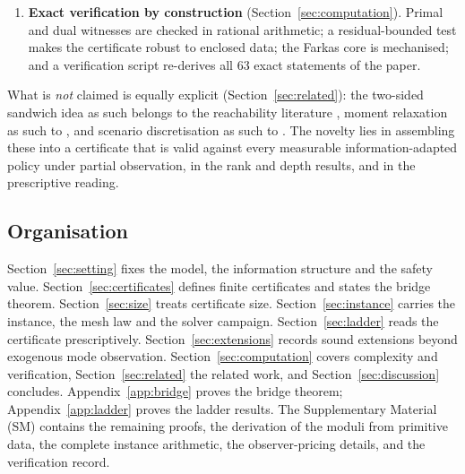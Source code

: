 \begin{enumerate}[leftmargin=1.6em,itemsep=2pt]
\item \textbf{Exact verification by construction} (Section~\ref{sec:computation}). Primal and dual witnesses are checked in rational arithmetic; a residual-bounded test makes the certificate robust to enclosed data; the Farkas core is mechanised; and a verification script re-derives all 63 exact statements of the paper.
\end{enumerate}

What is \emph{not} claimed is equally explicit (Section~\ref{sec:related}): the two-sided sandwich idea as such belongs to the reachability literature \cite{Maidens2013}, moment relaxation as such to \cite{Lasserre2001,Parrilo2003,Lasserre2008}, and scenario discretisation as such to \cite{CalafioreCampi2006,CampiGaratti2008}. The novelty lies in assembling these into a certificate that is valid against every measurable information-adapted policy under partial observation, in the rank and depth results, and in the prescriptive reading.

\subsection{Organisation}

Section~\ref{sec:setting} fixes the model, the information structure and the safety value. Section~\ref{sec:certificates} defines finite certificates and states the bridge theorem. Section~\ref{sec:size} treats certificate size. Section~\ref{sec:instance} carries the instance, the mesh law and the solver campaign. Section~\ref{sec:ladder} reads the certificate prescriptively. Section~\ref{sec:extensions} records sound extensions beyond exogenous mode observation. Section~\ref{sec:computation} covers complexity and verification, Section~\ref{sec:related} the related work, and Section~\ref{sec:discussion} concludes. Appendix~\ref{app:bridge} proves the bridge theorem; Appendix~\ref{app:ladder} proves the ladder results. The Supplementary Material (SM) contains the remaining proofs, the derivation of the moduli from primitive data, the complete instance arithmetic, the observer-pricing details, and the verification record.
